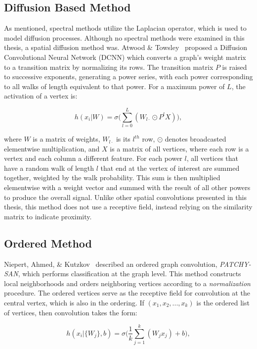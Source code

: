 \subsection{Diffusion Based Method}
As mentioned, spectral methods utilize the Laplacian operator, which is used to model diffusion processes. 
Although no spectral methods were examined in this thesis, a spatial diffusion method was.
Atwood \& Towsley~\cite{atwood2016} proposed a Diffusion Convolutional Neural Network (DCNN) which converts a graph's weight matrix to a transition matrix by normalizing its rows.
The transition matrix $P$ is raised to successive exponents, generating a power series, with each power corresponding to all walks of length equivalent to that power.
For a maximum power of $L$, the activation of a vertex is:

\begin{equation}
h(x_i | W) = \sigma \bigg( \sum_{l=0}^L (W_{l\cdot} \odot P^l X ) \bigg),
\label{eq:diffusion}
\end{equation}

\noindent
where $W$ is a matrix of weights, $W_{l\cdot}$ is its $l^{th}$ row, $\odot$ denotes broadcasted elementwise multiplication, and $X$ is a matrix of all vertices, where each row is a vertex and each column a different feature.
For each power $l$, all vertices that have a random walk of length $l$ that end at the vertex of interest are summed together, weighted by the walk probability.
This sum is then multiplied elementwise with a weight vector and summed with the result of all other powers to produce the overall signal.
Unlike other spatial convolutions presented in this thesis, this method does not use a receptive field, instead relying on the similarity matrix to indicate proximity.


\subsection{Ordered Method}

Niepert, Ahmed, \& Kutzkov~\cite{niepert2016} described an ordered graph convolution, \emph{PATCHY-SAN}, which performs classification at the graph level.
This method constructs local neighborhoods and orders neighboring vertices according to a \emph{normalization} procedure.
The ordered vertices serve as the receptive field for convolution at the central vertex, which is also in the ordering. 
If $(x_1, x_2, ... , x_k)$ is the ordered list of vertices, then convolution takes the form:

\begin{equation}
h(x_i | \{ W_{j} \}, b)= \sigma \bigg( \frac{1}{k} \sum_{j=1}^{k}(W_{j} x_j) + b \bigg),
\label{eq:patchysan}
\end{equation}

